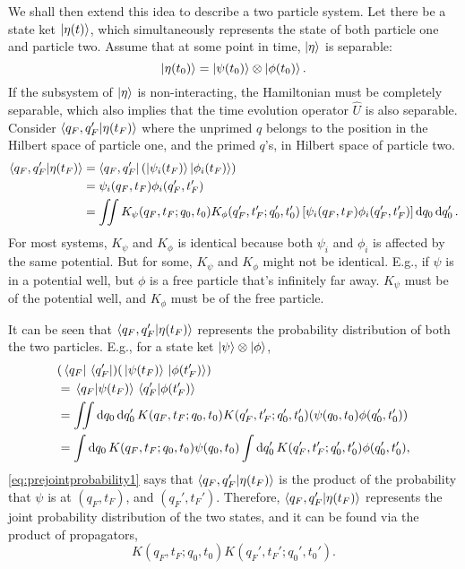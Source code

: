 We shall then extend this idea to describe a two particle system. Let there be a state ket $\ket{\eta(t)}$, which simultaneously represents the state of both particle one and particle two. Assume that at some point in time, $\ket{\eta}$ is separable:
\begin{equation}
    \ket{\eta(t_0)} = \ket{\psi(t_0)} \otimes \ket{\phi(t_0)}.
\end{equation}
If the subsystem of $\ket{\eta}$ is non-interacting, the Hamiltonian must be completely separable, which also implies that the time evolution operator $\hat{U}$ is also separable. Consider $\braket{q_F, q_F'}{\eta(t_F)}$ where the unprimed $q$ belongs to the position in the Hilbert space of particle one, and the primed $q$'s, in Hilbert space of particle two.
\begin{align*}
    \braket{q_F, q_F'}{\eta(t_F)} &= \bra{q_F, q_F'}\left(\ket{\psi_i(t_F)}\ket{\phi_i(t_F)}\right) \\
    &= \psi_i(q_F, t_F)\phi_i(q_F', t_F') \\
    &= \iint K_{\psi}(q_F, t_F; q_0, t_0)K_{\phi}(q_F', t_F'; q_0', t_0')\left[\psi_i(q_F, t_F)\phi_i(q_F', t_F')\right] \dd{q_0}\dd{q_0'}.
\end{align*}
For most systems, $K_{\psi}$ and $K_{\phi}$ is identical because both $\psi_i$ and $\phi_i$ is affected by the same potential. But for some, $K_{\psi}$ and $K_{\phi}$ might not be identical. E.g., if $\psi$ is in a potential well, but $\phi$ is a free particle that's infinitely far away. $K_{\psi}$ must be of the potential well, and $K_{\phi}$ must be of the free particle.

It can be seen that $\braket{q_F, q_F'}{\eta(t_F)}$ represents the probability distribution of both the two particles. E.g., for a state ket $\ket{\psi}\otimes\ket{\phi}$,
\begin{align}
    & (\bra*{q_F}\bra*{q_F'})(\ket*{\psi(t_F)}\ket*{\phi(t_F')}) \\
    &= \braket*{q_F}{\psi(t_F)}\braket*{q_F'}{\phi(t_F')} \label{eq:prejointprobability1}\\
    &= \iint\dd{q_0}\dd{q_0'}K(q_F, t_F; q_0, t_0)K(q_F', t_F';q_0', t_0')(\psi(q_0, t_0)\phi(q_0', t_0')) \\
    &= \int\dd{q_0}K(q_F, t_F; q_0, t_0)\psi(q_0, t_0)\int\dd{q_0'}K(q_F', t_F';q_0', t_0')\phi(q_0', t_0'), \label{eq:prejointprobability2}
\end{align}
\cref{eq:prejointprobability1} says that $\braket{q_F, q_F'}{\eta(t_F)}$ is the product of the probability that $\psi$ is at $(q_F, t_F)$, and $(q_F', t_F')$. Therefore, $\braket{q_F, q_F'}{\eta(t_F)}$ represents the joint probability distribution of the two states, and it can be found via the product of propagators,
\begin{equation}
    K(q_F, t_F; q_0, t_0)K(q_F', t_F';q_0', t_0').
\end{equation}

